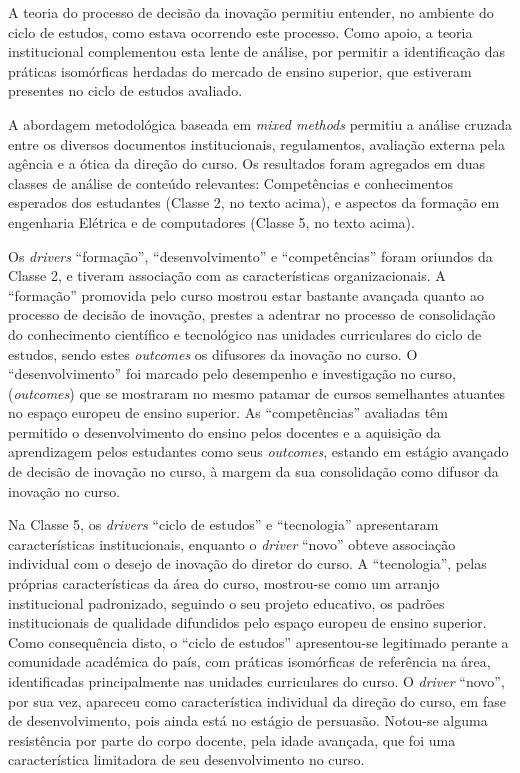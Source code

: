 \documentclass{textolivre-html}
\begin{document}
A teoria do processo de decisão da inovação permitiu entender, no ambiente do ciclo de estudos, como estava ocorrendo este processo. Como apoio, a teoria institucional complementou esta lente de análise, por permitir a identificação das práticas isomórficas herdadas do mercado de ensino superior, que estiveram presentes no ciclo de estudos avaliado.

A abordagem metodológica baseada em \textit{mixed methods} permitiu a análise cruzada entre os diversos documentos institucionais, regulamentos, avaliação externa pela agência e a ótica da direção do curso. Os resultados foram agregados em duas classes de análise de conteúdo relevantes: Competências e conhecimentos esperados dos estudantes (Classe 2, no texto acima), e aspectos da formação em engenharia Elétrica e de computadores (Classe 5, no texto acima).   

Os \textit{drivers} “formação”, “desenvolvimento” e “competências” foram oriundos da Classe 2, e tiveram associação com as características organizacionais. A “formação” promovida pelo curso mostrou estar bastante avançada quanto ao processo de decisão de inovação, prestes a adentrar no processo de consolidação do conhecimento científico e tecnológico nas unidades curriculares do ciclo de estudos, sendo estes \textit{outcomes} os difusores da inovação no curso. O “desenvolvimento” foi marcado pelo desempenho e investigação no curso, (\textit{outcomes}) que se mostraram no mesmo patamar de cursos semelhantes atuantes no espaço europeu de ensino superior. As “competências” avaliadas têm permitido o desenvolvimento do ensino pelos docentes e a aquisição da aprendizagem pelos estudantes como seus \textit{outcomes}, estando em estágio avançado de decisão de inovação no curso, à margem da sua consolidação como difusor da inovação no curso.

Na Classe 5, os \textit{drivers} “ciclo de estudos” e “tecnologia” apresentaram características institucionais, enquanto o \textit{driver} “novo” obteve associação individual com o desejo de inovação do diretor do curso. A “tecnologia”, pelas próprias características da área do curso, mostrou-se como um arranjo institucional padronizado, seguindo o seu projeto educativo, os padrões institucionais de qualidade difundidos pelo espaço europeu de ensino superior. Como consequência disto, o “ciclo de estudos” apresentou-se legitimado perante a comunidade académica do país, com práticas isomórficas de referência na área, identificadas principalmente nas unidades curriculares do curso. O \textit{driver} “novo”, por sua vez, apareceu como característica individual da direção do curso, em fase de desenvolvimento, pois ainda está no estágio de persuasão. Notou-se alguma resistência por parte do corpo docente, pela idade avançada, que foi uma característica limitadora de seu desenvolvimento no curso. 
\end{document}
